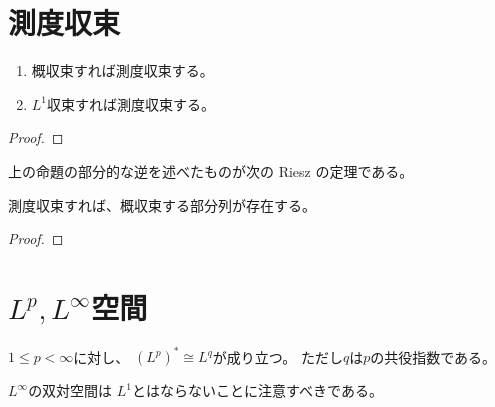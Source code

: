 \documentclass[report]{jlreq}
\begin{document}
\section{測度収束}


\begin{definition}
    \TODO{}
\end{definition}

\begin{proposition}
    \begin{enumerate}
        \item 概収束すれば測度収束する。
        \item $L^1$収束すれば測度収束する。
    \end{enumerate}
\end{proposition}

\begin{proof}
    \TODO{}
\end{proof}

上の命題の部分的な逆を述べたものが次の Riesz の定理である。

\begin{theorem}[Riesz]
    測度収束すれば、概収束する部分列が存在する。
\end{theorem}

\begin{proof}
    \TODO{}
\end{proof}

%
\section{$L^p, L^\infty$空間}

\begin{definition}[$L^p$空間、$L^\infty$空間]
    \TODO{}
\end{definition}

\begin{proposition}
    $1 \le p < \infty$に対し、
    $(L^p)^* \cong L^q$が成り立つ。
    ただし$q$は$p$の共役指数である。
\end{proposition}

\begin{remark}
    $L^\infty$の双対空間は
    $L^1$とはならないことに注意すべきである。
\end{remark}
\end{document}
